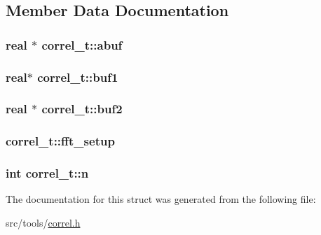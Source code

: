 \subsection{\-Member \-Data \-Documentation}
\hypertarget{structcorrel__t_a61d67c4f5fe9fecd12fdfa62f908670c}{
\subsubsection[{abuf}]{\setlength{\rightskip}{0pt plus 5cm}real $\ast$ {\bf correl\-\_\-t\-::abuf}}}\label{structcorrel__t_a61d67c4f5fe9fecd12fdfa62f908670c}
\hypertarget{structcorrel__t_afcd83c84bf890b7b205c432d34f5c95d}{
\subsubsection[{buf1}]{\setlength{\rightskip}{0pt plus 5cm}real$\ast$ {\bf correl\-\_\-t\-::buf1}}}\label{structcorrel__t_afcd83c84bf890b7b205c432d34f5c95d}
\hypertarget{structcorrel__t_a5ce5e0a8bebd5bf7fe33463e4411179f}{
\subsubsection[{buf2}]{\setlength{\rightskip}{0pt plus 5cm}real $\ast$ {\bf correl\-\_\-t\-::buf2}}}\label{structcorrel__t_a5ce5e0a8bebd5bf7fe33463e4411179f}
\hypertarget{structcorrel__t_abaa348f82f1bf274a8ab865c487e05be}{
\subsubsection[{fft\-\_\-setup}]{ {\bf correl\-\_\-t\-::fft\-\_\-setup}}}\label{structcorrel__t_abaa348f82f1bf274a8ab865c487e05be}
\hypertarget{structcorrel__t_a86c101730240d7b3053b5a8e3638e9fb}{
\subsubsection[{n}]{\setlength{\rightskip}{0pt plus 5cm}int {\bf correl\-\_\-t\-::n}}}\label{structcorrel__t_a86c101730240d7b3053b5a8e3638e9fb}


\-The documentation for this struct was generated from the following file\-:\begin{DoxyCompactItemize}
\item 
src/tools/\hyperlink{correl_8h}{correl.\-h}\end{DoxyCompactItemize}
